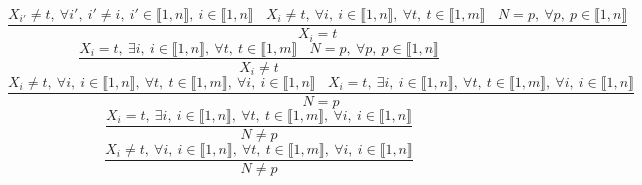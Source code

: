 $$\frac{X_{i'} \neq t,~\forall i',~i' \neq i,~i' \in \llbracket1,n\rrbracket,~i \in \llbracket1,n\rrbracket~~~~X_{i} \neq t,~\forall i,~i \in \llbracket1,n\rrbracket,~\forall t,~t \in \llbracket1,m\rrbracket~~~~N=p,~\forall p,~p \in \llbracket1,n\rrbracket}{X_{i}=t}$$ $$\frac{X_{i}=t,~\exists i,~i \in \llbracket1,n\rrbracket,~\forall t,~t \in \llbracket1,m\rrbracket~~~~N=p,~\forall p,~p \in \llbracket1,n\rrbracket}{X_{i} \neq t}$$ $$\frac{X_{i} \neq t,~\forall i,~i \in \llbracket1,n\rrbracket,~\forall t,~t \in \llbracket1,m\rrbracket,~\forall i,~i \in \llbracket1,n\rrbracket~~~~X_{i}=t,~\exists i,~i \in \llbracket1,n\rrbracket,~\forall t,~t \in \llbracket1,m\rrbracket,~\forall i,~i \in \llbracket1,n\rrbracket}{N=p}$$ $$\frac{X_{i}=t,~\exists i,~i \in \llbracket1,n\rrbracket,~\forall t,~t \in \llbracket1,m\rrbracket,~\forall i,~i \in \llbracket1,n\rrbracket}{N \neq p}$$ $$\frac{X_{i} \neq t,~\forall i,~i \in \llbracket1,n\rrbracket,~\forall t,~t \in \llbracket1,m\rrbracket,~\forall i,~i \in \llbracket1,n\rrbracket}{N \neq p}$$ 
